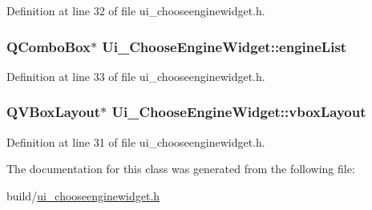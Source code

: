 Definition at line 32 of file ui\+\_\+chooseenginewidget.\+h.

\hypertarget{classUi__ChooseEngineWidget_aa7a6b768bf39b9a1f5e968edab33d00b}{
\subsubsection[{engine\+List}]{\setlength{\rightskip}{0pt plus 5cm}Q\+Combo\+Box$\ast$ Ui\+\_\+\+Choose\+Engine\+Widget\+::engine\+List}}\label{classUi__ChooseEngineWidget_aa7a6b768bf39b9a1f5e968edab33d00b}


Definition at line 33 of file ui\+\_\+chooseenginewidget.\+h.

\hypertarget{classUi__ChooseEngineWidget_abccfd24c2a3c6025b0099569dd4a4ab1}{
\subsubsection[{vbox\+Layout}]{\setlength{\rightskip}{0pt plus 5cm}Q\+V\+Box\+Layout$\ast$ Ui\+\_\+\+Choose\+Engine\+Widget\+::vbox\+Layout}}\label{classUi__ChooseEngineWidget_abccfd24c2a3c6025b0099569dd4a4ab1}


Definition at line 31 of file ui\+\_\+chooseenginewidget.\+h.



The documentation for this class was generated from the following file\+:\begin{DoxyCompactItemize}
\item 
build/\hyperlink{ui__chooseenginewidget_8h}{ui\+\_\+chooseenginewidget.\+h}\end{DoxyCompactItemize}
